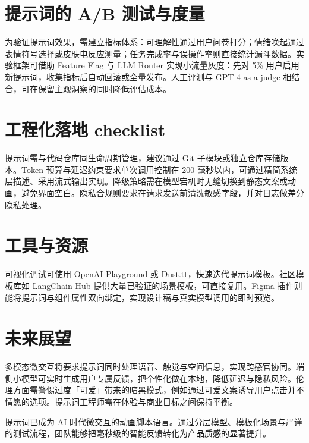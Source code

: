 \chapter{提示词的 A/B 测试与度量}
为验证提示词效果，需建立指标体系：可理解性通过用户问卷打分；情绪唤起通过表情符号选择或皮肤电反应测量；任务完成率与误操作率则直接统计漏斗数据。实验框架可借助 Feature Flag 与 LLM Router 实现小流量灰度：先对 5\%{} 用户启用新提示词，收集指标后自动回滚或全量发布。人工评测与 GPT-4-as-a-judge 相结合，可在保留主观洞察的同时降低评估成本。\par
\chapter{工程化落地 checklist}
提示词需与代码仓库同生命周期管理，建议通过 Git 子模块或独立仓库存储版本。Token 预算与延迟约束要求单次调用控制在 200 毫秒以内，可通过精简系统层描述、采用流式输出实现。降级策略需在模型宕机时无缝切换到静态文案或动画，避免界面空白。隐私合规则要求在请求发送前清洗敏感字段，并对日志做差分隐私处理。\par
\chapter{工具与资源}
可视化调试可使用 OpenAI Playground 或 Dust.tt，快速迭代提示词模板。社区模板库如 LangChain Hub 提供大量已验证的场景模板，可直接复用。Figma 插件则能将提示词与组件属性双向绑定，实现设计稿与真实模型调用的即时预览。\par
\chapter{未来展望}
多模态微交互将要求提示词同时处理语音、触觉与空间信息，实现跨感官协同。端侧小模型可实时生成用户专属反馈，把个性化做在本地，降低延迟与隐私风险。伦理方面需警惕过度「可爱」带来的暗黑模式，例如通过可爱文案诱导用户点击并不情愿的选项。提示词工程师需在体验与商业目标之间保持平衡。\par
提示词已成为 AI 时代微交互的动画脚本语言。通过分层模型、模板化场景与严谨的测试流程，团队能够把毫秒级的智能反馈转化为产品质感的显著提升。\par
